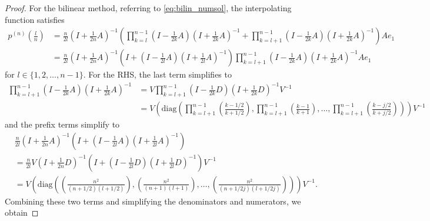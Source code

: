 \documentclass{article}
\theoremstyle{definition}
\newcommand{\pr}[1]{ \left( #1 \right) }
\begin{document}
\begin{proof}
     For the bilinear method, referring to \eqref{eq:bilin_numsol}, the interpolating function satisfies
     \begin{align*}
         p^{(n)}\pr{\frac{l}{n}} &= \frac{n}{2l} \pr{I+\frac{1}{2n}A}^{-1} 
         \pr{
         \prod_{k=l}^{n-1} 
         \pr{I - \frac{1}{2k}A}\pr{I + \frac{1}{2k}A}^{-1}
         + \prod_{k=l+1}^{n-1} 
         \pr{I - \frac{1}{2k}A}\pr{I + \frac{1}{2k}A}^{-1}
         }Ae_1 \\
         &= \frac{n}{2l} \pr{I+\frac{1}{2n}A}^{-1} 
        \pr{I + \pr{I-\frac{1}{2l}A}\pr{I+\frac{1}{2l}A}^{-1}}
         \prod_{k=l+1}^{n-1} 
         \pr{I - \frac{1}{2k}A}\pr{I + \frac{1}{2k}A}^{-1}
         Ae_1
     \end{align*}
     for $l \in \{1, 2, \dots, n-1\}$. 
     For the RHS, the last term simplifies to 
    \begin{align*}
        \prod_{k=l+1}^{n-1} 
         \pr{I - \frac{1}{2k}A}\pr{I + \frac{1}{2k}A}^{-1} 
         &= V \prod_{k=l+1}^{n-1}  \pr{I - \frac{1}{2k}D}\pr{I + \frac{1}{2k}D}^{-1}  V^{-1} \\ 
         &= V \pr{ \text{diag}\pr{ \prod_{k=l+1}^{n-1}\pr{\frac{k-1/2}{k+1/2} }, \prod_{k=l+1}^{n-1}\pr{\frac{k-1}{k+1} }, \dots, \prod_{k=l+1}^{n-1} \pr{ \frac{k-j/2}{k+j/2} }}}V^{-1}
    \end{align*}
    and the prefix terms simplify to 
    \begin{align*}
        &\frac{n}{2l} \pr{I+\frac{1}{2n}A}^{-1} 
        \pr{I + \pr{I-\frac{1}{2l}A}\pr{I+\frac{1}{2l}A}^{-1}}\\
        &= \frac{n}{2l} V \pr{I+\frac{1}{2n}D}^{-1} 
        \pr{I + \pr{I-\frac{1}{2l}D}\pr{I+\frac{1}{2l}D}^{-1}} V^{-1} \\
        &= V \pr{\text{diag} \pr{ 
        \pr{\frac{n^2}{(n+1/2)(l+1/2)}}, \pr{\frac{n^2}{(n+1)(l+1)}}, \dots, \pr{\frac{n^2}{(n+1/2j)(l+1/2j)}}}} V^{-1}.
    \end{align*}
    Combining these two terms and simplifying the denominators and numerators, we obtain 

\end{proof}
\end{document}
